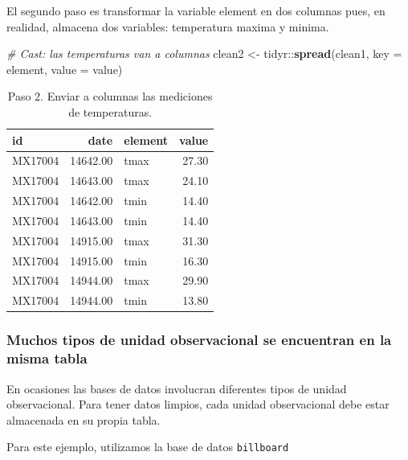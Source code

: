 \documentclass[]{article}
\newenvironment{Shaded}{\begin{snugshade}}{\end{snugshade}}
\newcommand{\KeywordTok}[1]{\textcolor[rgb]{0.13,0.29,0.53}{\textbf{{#1}}}}
\newcommand{\DataTypeTok}[1]{\textcolor[rgb]{0.13,0.29,0.53}{{#1}}}
\newcommand{\StringTok}[1]{\textcolor[rgb]{0.31,0.60,0.02}{{#1}}}
\newcommand{\CommentTok}[1]{\textcolor[rgb]{0.56,0.35,0.01}{\textit{{#1}}}}
\newcommand{\NormalTok}[1]{{#1}}
\begin{document}
El segundo paso es transformar la variable element en dos columnas pues,
en realidad, almacena dos variables: temperatura maxima y minima.

\begin{Shaded}
\begin{Highlighting}[]
\CommentTok{# Cast: las temperaturas van a columnas}
\NormalTok{clean2 <-}\StringTok{ }\NormalTok{tidyr::}\KeywordTok{spread}\NormalTok{(clean1, }\DataTypeTok{key =} \NormalTok{element, }\DataTypeTok{value =} \NormalTok{value)}
\end{Highlighting}
\end{Shaded}

\begin{table}[ht]
\centering
\begin{tabular}{lrlr}
  \hline
id & date & element & value \\ 
  \hline
MX17004 & 14642.00 & tmax & 27.30 \\ 
  MX17004 & 14643.00 & tmax & 24.10 \\ 
  MX17004 & 14642.00 & tmin & 14.40 \\ 
  MX17004 & 14643.00 & tmin & 14.40 \\ 
  MX17004 & 14915.00 & tmax & 31.30 \\ 
  MX17004 & 14915.00 & tmin & 16.30 \\ 
  MX17004 & 14944.00 & tmax & 29.90 \\ 
  MX17004 & 14944.00 & tmin & 13.80 \\ 
   \hline
\end{tabular}
\caption{Paso 2. Enviar a columnas las mediciones de temperaturas.} 
\label{tab:clima1}
\end{table}

\subsubsection{Muchos tipos de unidad observacional se encuentran en la
misma
tabla}\label{muchos-tipos-de-unidad-observacional-se-encuentran-en-la-misma-tabla}

En ocasiones las bases de datos involucran diferentes tipos de unidad
observacional. Para tener datos limpios, cada unidad observacional debe
estar almacenada en su propia tabla.

Para este ejemplo, utilizamos la base de datos \texttt{billboard}
\parencite[][archivo: data/billboard.csv]{tidydata}
\end{document}
